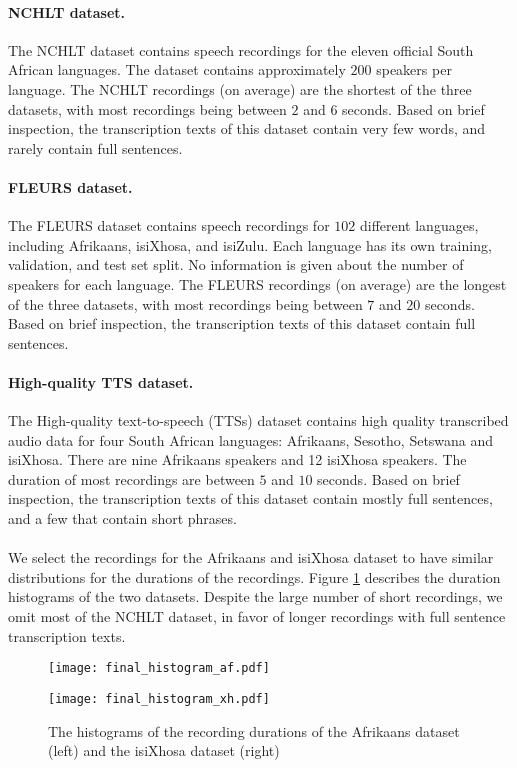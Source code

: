\paragraph*{NCHLT dataset.}
The NCHLT \cite{barnard2014nchlt} dataset contains speech recordings for the eleven official South African languages.
The dataset contains approximately $200$ speakers per language.
The NCHLT recordings (on average) are the shortest of the three datasets, with most recordings being between $2$ and $6$ seconds.
Based on brief inspection, the transcription texts of this dataset contain very few words, and rarely contain full sentences.

\paragraph*{FLEURS dataset.}
The FLEURS \cite{fleurs2022arxiv} dataset contains speech recordings for $102$ different languages, including Afrikaans, isiXhosa, and isiZulu.
Each language has its own training, validation, and test set split.
No information is given about the number of speakers for each language.
The FLEURS recordings (on average) are the longest of the three datasets, with most recordings being between $7$ and $20$ seconds.
Based on brief inspection, the transcription texts of this dataset contain full sentences.

\paragraph*{High-quality TTS dataset.}
The High-quality text-to-speech (TTSs) \cite{hq2017} dataset contains high quality transcribed audio data for four South African languages: Afrikaans, Sesotho, Setswana and isiXhosa.
There are nine Afrikaans speakers and 12 isiXhosa speakers.
The duration of most recordings are between $5$ and $10$ seconds.
Based on brief inspection, the transcription texts of this dataset contain mostly full sentences, and a few that contain short phrases.
\\
\\
We select the recordings for the Afrikaans and isiXhosa dataset to have similar distributions for the durations of the recordings.
Figure \ref{fig:histogram} describes the duration histograms of the two datasets. Despite the large number of short recordings, we omit
most of the NCHLT dataset, in favor of longer recordings with full sentence transcription texts.

\begin{figure}[!ht]
    \centering
    \begin{minipage}{.5\textwidth}
      \centering
      \texttt{[image: final\_histogram\_af.pdf]}
    \end{minipage}%
    \begin{minipage}{.5\textwidth}
      \centering
      \texttt{[image: final\_histogram\_xh.pdf]}
    \end{minipage}
    \caption{The histograms of the recording durations of the Afrikaans dataset (left) and the isiXhosa dataset (right)}
    \label{fig:histogram}
\end{figure}

